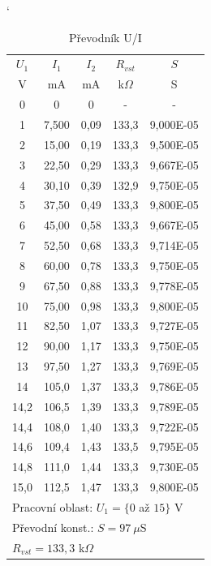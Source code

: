 \documentclass[a4paper, czech]{article}
\begin{document}
\begin{minipage}{0.48\textwidth}
    \begin{table}[H]
        \catcode`
        \centering
        \caption{Převodník U/I}
        \begin{tabular}{ccccc}
            \toprule
            $U_1$  & $I_1$  & $I_2$    & $R_{vst}$  & $S$     \\
            \cmidrule(rl){1-1}
            \cmidrule(rl){2-2}
            \cmidrule(rl){3-3}
            \cmidrule(rl){4-4}
            \cmidrule(rl){5-5}
            V    & mA    & mA   & k$\Omega$    & S         \\
            \midrule
            0    & 0     & 0    & -     & -         \\
            1    & 7,500 & 0,09 & 133,3 & 9,000E-05 \\
            2    & 15,00 & 0,19 & 133,3 & 9,500E-05 \\
            3    & 22,50 & 0,29 & 133,3 & 9,667E-05 \\
            4    & 30,10 & 0,39 & 132,9 & 9,750E-05 \\
            5    & 37,50 & 0,49 & 133,3 & 9,800E-05 \\
            6    & 45,00 & 0,58 & 133,3 & 9,667E-05 \\
            7    & 52,50 & 0,68 & 133,3 & 9,714E-05 \\
            8    & 60,00 & 0,78 & 133,3 & 9,750E-05 \\
            9    & 67,50 & 0,88 & 133,3 & 9,778E-05 \\
            10   & 75,00 & 0,98 & 133,3 & 9,800E-05 \\
            11   & 82,50 & 1,07 & 133,3 & 9,727E-05 \\
            12   & 90,00 & 1,17 & 133,3 & 9,750E-05 \\
            13   & 97,50 & 1,27 & 133,3 & 9,769E-05 \\
            14   & 105,0 & 1,37 & 133,3 & 9,786E-05 \\
            14,2 & 106,5 & 1,39 & 133,3 & 9,789E-05 \\
            14,4 & 108,0 & 1,40 & 133,3 & 9,722E-05 \\
            14,6 & 109,4 & 1,43 & 133,5 & 9,795E-05 \\
            14,8 & 111,0 & 1,44 & 133,3 & 9,730E-05 \\
            15,0 & 112,5 & 1,47 & 133,3 & 9,800E-05 \\
            \bottomrule
            \multicolumn{5}{l}{Pracovní oblast: $U_1 = \{0$ až $15\}$ V} \\
            \multicolumn{5}{l}{Převodní konst.: $S = 97\ \mu$S} \\
            \multicolumn{5}{l}{$R_{vst} = 133,3$ k$\Omega$} \\
        \end{tabular}
    \end{table}
\end{minipage}
\end{document}
